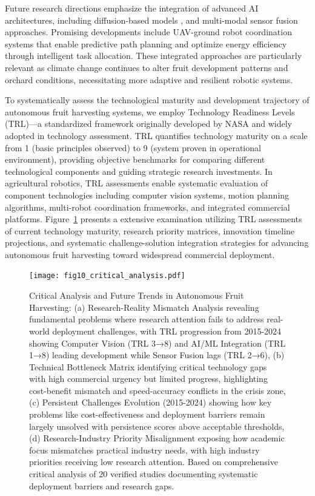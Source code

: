 \documentclass{ieeeaccess}
\begin{document}
Future research directions emphasize the integration of advanced AI architectures, including diffusion-based models \cite{heschl2024synthset}, and multi-modal sensor fusion approaches. Promising developments include UAV-ground robot coordination systems that enable predictive path planning and optimize energy efficiency through intelligent task allocation. These integrated approaches are particularly relevant as climate change continues to alter fruit development patterns and orchard conditions, necessitating more adaptive and resilient robotic systems.

To systematically assess the technological maturity and development trajectory of autonomous fruit harvesting systems, we employ Technology Readiness Levels (TRL)—a standardized framework originally developed by NASA and widely adopted in technology assessment. TRL quantifies technology maturity on a scale from 1 (basic principles observed) to 9 (system proven in operational environment), providing objective benchmarks for comparing different technological components and guiding strategic research investments. In agricultural robotics, TRL assessments enable systematic evaluation of component technologies including computer vision systems, motion planning algorithms, multi-robot coordination frameworks, and integrated commercial platforms. Figure~\ref{fig:future_directions_roadmap} presents a extensive examination utilizing TRL assessments of current technology maturity, research priority matrices, innovation timeline projections, and systematic challenge-solution integration strategies for advancing autonomous fruit harvesting toward widespread commercial deployment.

\begin{figure}[htbp]
\centering
\texttt{[image: fig10\_critical\_analysis.pdf]}
\caption{Critical Analysis and Future Trends in Autonomous Fruit Harvesting: (a) Research-Reality Mismatch Analysis revealing fundamental problems where research attention fails to address real-world deployment challenges, with TRL progression from 2015-2024 showing Computer Vision (TRL 3→8) and AI/ML Integration (TRL 1→8) leading development while Sensor Fusion lags (TRL 2→6), (b) Technical Bottleneck Matrix identifying critical technology gaps with high commercial urgency but limited progress, highlighting cost-benefit mismatch and speed-accuracy conflicts in the crisis zone, (c) Persistent Challenges Evolution (2015-2024) showing how key problems like cost-effectiveness and deployment barriers remain largely unsolved with persistence scores above acceptable thresholds, (d) Research-Industry Priority Misalignment exposing how academic focus mismatches practical industry needs, with high industry priorities receiving low research attention. Based on comprehensive critical analysis of 20 verified studies documenting systematic deployment barriers and research gaps.}
\label{fig:future_directions_roadmap}
\end{figure}
\end{document}
